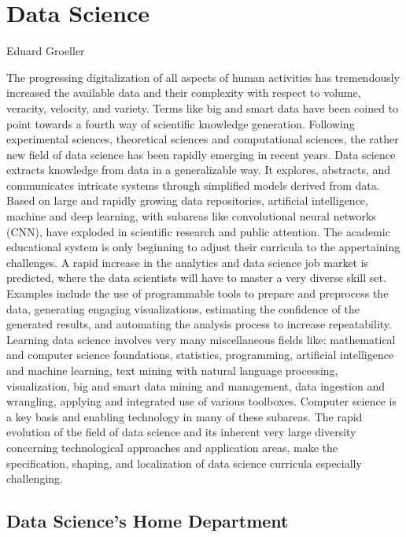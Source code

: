 \section{Data Science}
Eduard Groeller

The progressing digitalization of all aspects of human activities has tremendously increased the available data and their complexity with respect to volume, veracity, velocity, and variety. Terms like big and smart data have been coined to point towards a fourth way of scientific knowledge generation. Following experimental sciences, theoretical sciences and computational sciences, the rather new field of data science has been rapidly emerging in recent years. Data science extracts knowledge from data in a generalizable way. It explores, abstracts, and communicates intricate systems through simplified models derived from data. Based on large and rapidly growing data repositories, artificial intelligence, machine and deep learning, with subareas like convolutional neural networks (CNN), have exploded in scientific research and public attention. The academic educational system is only beginning to adjust their curricula to the appertaining challenges. A rapid increase in the analytics and data science job market is predicted, where the data scientists will have to master a very diverse skill set. Examples include the use of programmable tools to prepare and preprocess the data, generating engaging visualizations, estimating the confidence of the generated results, and automating the analysis process to increase repeatability. Learning data science involves very many miscellaneous fields like: mathematical and computer science foundations, statistics, programming, artificial intelligence and machine learning, text mining with natural language processing, visualization, big and smart data mining and management, data ingestion and wrangling, applying and integrated use of various toolboxes. Computer science is a key basis and enabling technology in many of these subareas. The rapid evolution of the field of data science and its inherent very large diversity concerning technological approaches and application areas, make the specification, shaping, and localization of data science curricula especially challenging.

\subsection{Data Science's Home Department}

